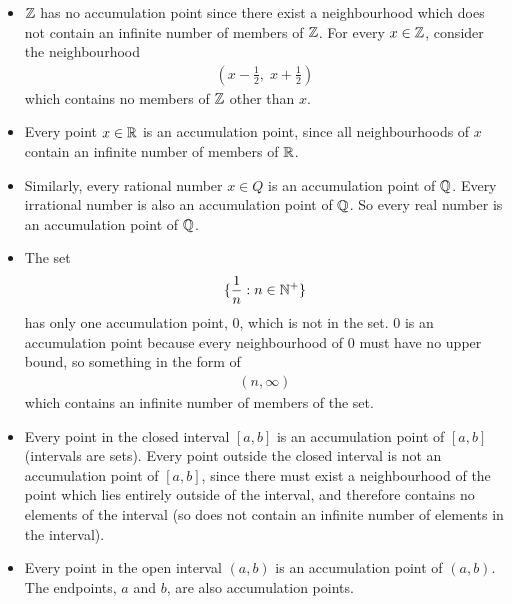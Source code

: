 \begin{itemize}
  \item $\mathbb{Z}$ has no accumulation point since there exist a neighbourhood which does not contain an infinite number of members of $\mathbb{Z}$. For every $x \in \mathbb{Z}$, consider the neighbourhood
    \begin{align*}
      (x - \frac{1}{2},\; x + \frac{1}{2})
    \end{align*}
    which contains no members of $\mathbb{Z}$ other than $x$.
  \item Every point $x \in \mathbb{R}$ is an accumulation point, since all neighbourhoods of $x$ contain an infinite number of members of $\mathbb{R}$.
  \item Similarly, every rational number $x \in Q$ is an accumulation point of $\mathbb{Q}$. Every irrational number is also an accumulation point of $\mathbb{Q}$. So every real number is an accumulation point of $\mathbb{Q}$.
  \item The set
    \begin{align*}
      \{ \frac{1}{n}: n \in \mathbb{N}^+ \}
    \end{align*} has only one accumulation point, 0, which is not in the set. 0 is an accumulation point because every neighbourhood of 0 must have no upper bound, so something in the form of 
    \begin{align*}
      (n, \infty)
    \end{align*}
    which contains an infinite number of members of the set.
  \item Every point in the closed interval $[a, b]$ is an accumulation point of $[a, b]$ (intervals are sets). Every point outside the closed interval is not an accumulation point of $[a, b]$, since there must exist a neighbourhood of the point which lies entirely outside of the interval, and therefore contains no elements of the interval (so does not contain an infinite number of elements in the interval).
  \item Every point in the open interval $(a, b)$ is an accumulation point of $(a, b)$. The endpoints, $a$ and $b$, are also accumulation points.
\end{itemize}


